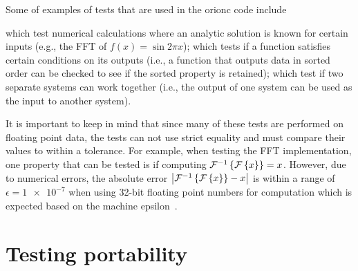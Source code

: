 Some of examples of tests that are used in the \gls{orionc} code include
\begin{enumerate*}[label={}]
	 which test numerical
		calculations where an analytic solution is known
		for certain inputs (e.g., the \acrshort{FFT} of
		\(f(x) = \sin 2\pi{}x\));
	 which tests if a function
		satisfies certain conditions on its outputs (i.e.,
		a function that outputs data in sorted order can
		be checked to see if the sorted property is
		retained);
	 which test if two
		separate systems can work together (i.e., the
		output of one system can be used as the input to
		another system).
\end{enumerate*}

It is important to keep in mind that since many of these tests are
performed on floating point data, the tests can not use strict
equality and must compare their values to within a tolerance. For
example, when testing the \acrshort{FFT} implementation, one property that
can be tested is if computing \(\mathcal{F}^{-1}\left\{\mathcal{F}\left\{x\right\}\right\} =
x\). However, due to numerical errors, the absolute error \(\left| \mathcal{F}^{-1}\left\{\mathcal{F}\left\{x\right\}\right\} -
x \right|\) is within a range of \(\epsilon = \num{1e-7}\) when
using 32-bit floating point numbers for
computation which is expected based on the machine epsilon~\autocite{fftw:accuracy-bench,Tashce:FFT-error}.

\section{Testing portability}

